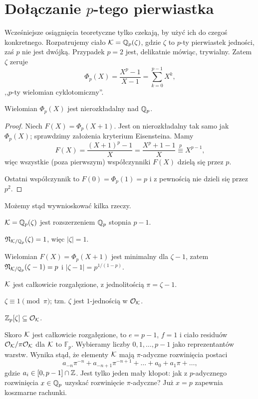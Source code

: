 \section{Dołączanie $p$-tego pierwiastka}
Wcześniejsze  osiągnięcia teoretyczne tylko czekają, by użyć ich do czegoś konkretnego.
Rozpatrujemy ciało $\mathcal K = \mathbb Q_p(\zeta)$, gdzie $\zeta$ to $p$-ty pierwiastek jedności, zaś $p$ nie jest dwójką.
Przypadek $p = 2$ jest, delikatnie mówiąc, trywialny.
Zatem $\zeta$ zeruje
\[
	\Phi_p(X) = \frac{X^p-1}{X-1} = \sum_{k=0}^{p-1} X^k,
\]
,,$p$-ty wielomian cyklotomiczny''.

\begin{lemat}
	Wielomian $\Phi_p(X)$ jest nierozkładalny nad $\mathbb Q_p$.
\end{lemat}

\begin{proof}
	Niech $F(X) = \Phi_p(X+1)$. Jest on nierozkładalny tak samo jak $\Phi_p(X)$; sprawdzimy założenia kryterium Eisensteina.
	Mamy
	\[
		F(X)  = \frac{(X+1)^p - 1}{X} = \frac{X^p + 1 - 1}{X} \stackrel {p} \equiv X^{p-1},
	\]
	więc wszystkie (poza pierwszym) współczynniki $F(X)$ dzielą się przez $p$.

	Ostatni współczynnik to $F(0) = \Phi_p(1) = p$ i z pewnością nie dzieli się przez $p^2$.
\end{proof}

Możemy stąd wywnioskować kilka rzeczy.
\begin{enumx}
	\item $\mathcal K = \mathbb Q_p(\zeta)$ jest rozszerzeniem $\mathbb Q_p$ stopnia $p-1$.
	\item $\mathfrak N_{\mathcal K/ \mathbb Q_p}(\zeta) = 1$, więc $|\zeta| = 1$.
	\item Wielomian $F(X) = \Phi_p(X+1)$ jest minimalny dla $\zeta - 1$, zatem $\mathfrak N_{\mathcal K/\mathbb Q_p}(\zeta - 1) = p$ i $|\zeta-1| = p^{1/(1-p)}$.
	\item $\mathcal K$ jest całkowicie rozgałęzione, z jednolitością $\pi = \zeta- 1$.
	\item $\zeta \equiv 1 \pmod \pi$; tzn. $\zeta$ jest $1$-jednością w $\mathcal O_{\mathcal K}$.
	\item $\mathbb Z_p[\zeta] \subseteq \mathcal O_{\mathcal K}$.
\end{enumx}

Skoro $\mathcal K$ jest całkowicie rozgałęzione, to $e = p-1$, $f = 1$ i ciało residuów $\mathcal O_{\mathcal K} / \pi \mathcal O_{\mathcal K}$ dla $\mathcal K$ to $\mathbb F_p$.
Wybieramy liczby $0, 1, \dots, p-1$ jako reprezentantów warstw.
Wynika stąd, że elementy $\mathcal K$ mają $\pi$-adyczne rozwinięcia postaci
\[
	a_{-n}\pi^{-n} + a_{-n+1}\pi^{-n+1} + \ldots + a_0 + a_1 \pi + \ldots,
\]
gdzie $a_i \in [0, p-1] \cap \mathbb Z$.
Jest tylko jeden mały kłopot: jak z $p$-adycznego rozwinięcia $x \in \mathbb Q_p$ uzyskać rozwinięcie $\pi$-adyczne?
Już $x = p$ zapewnia koszmarne rachunki.

